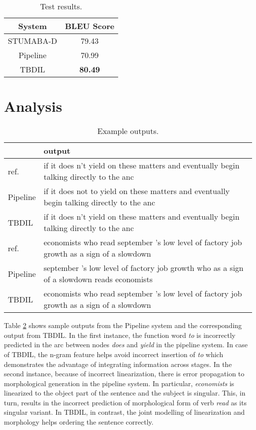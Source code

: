 \documentclass[11pt]{article}
\begin{document}
\begin{table}[t]
\centering
\small
\begin{tabular}{|c|c|}
\hline 
System & BLEU Score \\ 
\hline 
STUMABA-D & 79.43 \\ 
\hline 
Pipeline & 70.99  \\ 
\hline 
TBDIL & \textbf{80.49} \\ 
\hline 
\end{tabular} 
\caption{Test results.}
\label{tbl:test_results}
\end{table}
\section{Analysis}

\begin{table}[!t]
\setlength{\tabcolsep}{3.3pt}
\centering
\footnotesize
\begin{tabular}{l||p{}}
\hline
     & output   \\
\hline
ref. & if it does n't yield on these matters and eventually begin talking directly to the anc\\
Pipeline & if it does not to yield on these matters and eventually begin talking directly to the anc\\
TBDIL & if it does n't yield on these matters and eventually begin talking directly to the anc \\
\hline
ref. & economists who read september 's low level of factory job growth as a sign of a slowdown \\
Pipeline & september 's low level of factory job growth who as a sign of a slowdown reads economists \\
TBDIL & economists who read september 's low level of factory job growth as a sign of a slowdown\\
\hline
\end{tabular}
\caption{Example outputs.}
\label{tab:example-outputs}
\vspace*{-1em}
\end{table}

Table \ref{tab:example-outputs} shows sample outputs from the Pipeline system and the corresponding output from TBDIL. In the first instance, the function word {\it to} is incorrectly predicted in the arc between nodes {\it does} and {\it yield} in the pipeline system. In case of TBDIL, the n-gram feature helps avoid incorrect insertion of {\it to} which demonstrates the advantage of integrating information across stages. In the second instance, because of incorrect linearization, there is error propagation to morphological generation in the pipeline system. In particular, {\it economists} is linearized to the object part of the sentence and the subject is singular. This, in turn, results in the incorrect prediction of morphological form of verb {\it read} as its singular variant. In TBDIL, in contrast, the joint modelling of linearization and morphology helps ordering the sentence correctly.
\end{document}
